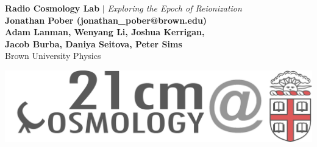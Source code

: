 \documentclass[a0,landscape]{a0poster}
\begin{document}


\begin{minipage}[b]{0.5\textwidth}
\veryHuge \color{Brown} \textbf{Radio Cosmology Lab} \color{Black}\textbf{$|$} \color{Black}\LARGE\textit{Exploring the Epoch of Reionization}\\
\textbf{Jonathan Pober (jonathan\_pober@brown.edu)}\\
\textbf{Adam Lanman, Wenyang Li, Joshua Kerrigan, \\Jacob Burba, Daniya Seitova, Peter Sims}\\ %
\huge Brown University Physics\\ %
\end{minipage}
\begin{minipage}[b]{0.6\linewidth}
\includegraphics[width=45cm]{radiologo_update.png} %
\end{minipage}

\end{document}
